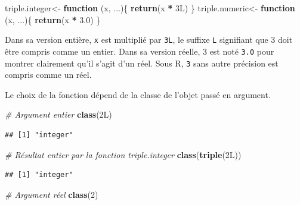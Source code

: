 \documentclass[
  12pt,
  french,
  a4paper,
  extrafontsizes,onecolumn,openright
  ]{memoir}
\newenvironment{Shaded}{\begin{snugshade}}{\end{snugshade}}
\newcommand{\CommentTok}[1]{\textcolor[rgb]{0.56,0.35,0.01}{\textit{#1}}}
\newcommand{\ControlFlowTok}[1]{\textcolor[rgb]{0.13,0.29,0.53}{\textbf{#1}}}
\newcommand{\DecValTok}[1]{\textcolor[rgb]{0.00,0.00,0.81}{#1}}
\newcommand{\FloatTok}[1]{\textcolor[rgb]{0.00,0.00,0.81}{#1}}
\newcommand{\KeywordTok}[1]{\textcolor[rgb]{0.13,0.29,0.53}{\textbf{#1}}}
\newcommand{\NormalTok}[1]{#1}
\newcommand{\OperatorTok}[1]{\textcolor[rgb]{0.81,0.36,0.00}{\textbf{#1}}}
\newcommand{\StringTok}[1]{\textcolor[rgb]{0.31,0.60,0.02}{#1}}
\begin{document}
\begin{Shaded}
\begin{Highlighting}[]
\NormalTok{triple.integer<-}\StringTok{ }\ControlFlowTok{function}\NormalTok{ (x, ...)\{}
  \KeywordTok{return}\NormalTok{(x }\OperatorTok{*}\StringTok{ }\NormalTok{3L)}
\NormalTok{\}}
\NormalTok{triple.numeric<-}\StringTok{ }\ControlFlowTok{function}\NormalTok{ (x, ...)\{}
  \KeywordTok{return}\NormalTok{(x }\OperatorTok{*}\StringTok{ }\FloatTok{3.0}\NormalTok{)}
\NormalTok{\}}
\end{Highlighting}
\end{Shaded}

\normalsize

Dans sa version entière, \texttt{x} est multiplié par \texttt{3L}, le suffixe \texttt{L} signifiant que 3 doit être compris comme un entier.
Dans sa version réelle, 3 est noté \texttt{3.0} pour montrer clairement qu'il s'agit d'un réel.
Sous R, \texttt{3} sans autre précision est compris comme un réel.

Le choix de la fonction dépend de la classe de l'objet passé en argument.

\scriptsize

\begin{Shaded}
\begin{Highlighting}[]
\CommentTok{# Argument entier}
\KeywordTok{class}\NormalTok{(2L)}
\end{Highlighting}
\end{Shaded}

\begin{verbatim}
## [1] "integer"
\end{verbatim}

\begin{Shaded}
\begin{Highlighting}[]
\CommentTok{# Résultat entier par la fonction triple.integer}
\KeywordTok{class}\NormalTok{(}\KeywordTok{triple}\NormalTok{(2L))}
\end{Highlighting}
\end{Shaded}

\begin{verbatim}
## [1] "integer"
\end{verbatim}

\begin{Shaded}
\begin{Highlighting}[]
\CommentTok{# Argument réel}
\KeywordTok{class}\NormalTok{(}\DecValTok{2}\NormalTok{)}
\end{Highlighting}
\end{Shaded}
\end{document}
